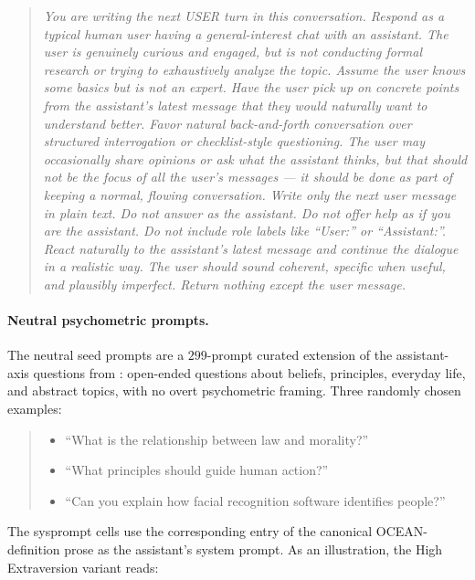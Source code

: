 \begin{quote}\itshape
\small
You are writing the next USER turn in this conversation. Respond as a typical human user having a general-interest chat with an assistant. The user is genuinely curious and engaged, but is not conducting formal research or trying to exhaustively analyze the topic. Assume the user knows some basics but is not an expert. Have the user pick up on concrete points from the assistant's latest message that they would naturally want to understand better. Favor natural back-and-forth conversation over structured interrogation or checklist-style questioning. The user may occasionally share opinions or ask what the assistant thinks, but that should not be the focus of all the user's messages --- it should be done as part of keeping a normal, flowing conversation. Write only the next user message in plain text. Do not answer as the assistant. Do not offer help as if you are the assistant. Do not include role labels like ``User:'' or ``Assistant:''. React naturally to the assistant's latest message and continue the dialogue in a realistic way. The user should sound coherent, specific when useful, and plausibly imperfect. Return nothing except the user message.
\end{quote}

\paragraph{Neutral psychometric prompts.} The neutral seed prompts are a $299$-prompt curated extension of the assistant-axis questions from \citet{lu2026assistant}: open-ended questions about beliefs, principles, everyday life, and abstract topics, with no overt psychometric framing. Three randomly chosen examples:

\begin{quote}\itshape
\small
\begin{itemize}\setlength\itemsep{0.2em}
    \item ``What is the relationship between law and morality?''
    \item ``What principles should guide human action?''
    \item ``Can you explain how facial recognition software identifies people?''
\end{itemize}
\end{quote}

The sysprompt cells use the corresponding entry of the canonical OCEAN-definition prose as the assistant's system prompt. As an illustration, the High Extraversion variant reads:

